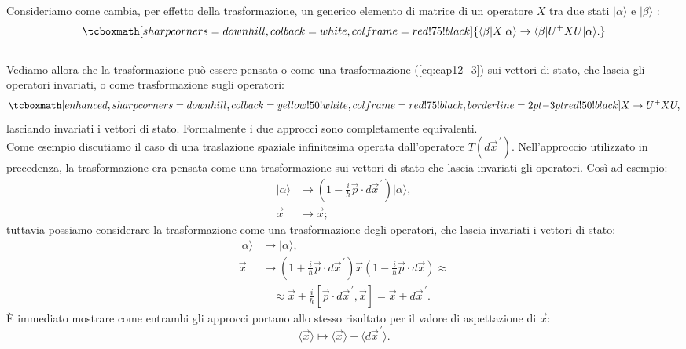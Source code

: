 \documentclass[a4paper,12pt,oneside]{book}
\begin{document}
Consideriamo come cambia, per effetto della trasformazione, un generico elemento di matrice di un operatore ${X}$ tra due stati $|\alpha \rangle$ e $|\beta\rangle$ :
	\begin{equation}
		\tcboxmath[sharp corners=downhill, colback=white, colframe=red!75!black]{
			\langle \beta|{X}|\alpha \rangle   \rightarrow    \langle \beta |{U}^+{X}{U}|\alpha \rangle.
			}
	\end{equation}\\

Vediamo allora che la trasformazione può essere pensata o come una trasformazione (\ref{eq:cap12_3})  sui vettori di stato, che lascia gli operatori invariati, o come trasformazione sugli operatori:
	\begin{equation}
	\label{eq:cap12_4}
		\tcboxmath[enhanced, sharp corners=downhill, colback=yellow!50!white, colframe=red!75!black, borderline={2pt}{-3pt}{red!50!black}]{
		{X}\rightarrow {U}^+ {X}{U},}
	\end{equation}
lasciando invariati i vettori di stato. Formalmente i due approcci sono completamente equivalenti.\\

Come esempio discutiamo il caso di una traslazione spaziale infinitesima operata dall'operatore $T(d\vec{x}^{\,\prime})$.
Nell'approccio utilizzato in precedenza, la trasformazione era pensata come una trasformazione sui vettori di stato che lascia invariati gli operatori. Così ad esempio:
	\begin{align}
		  |\alpha \rangle &\rightarrow (1- \frac{i}{\hbar}\vec{p}\cdot d\vec{x}^{\, \prime}) |\alpha \rangle ,  \\
		  \vec{x}&\rightarrow \vec{x};  
	\end{align}
tuttavia possiamo considerare la trasformazione come una trasformazione degli operatori, che lascia invariati i vettori di stato:
	\begin{align}
			|\alpha \rangle &\rightarrow  |\alpha \rangle , \\
			\vec{x} &\rightarrow \left(1+ \frac{i}{\hbar} \vec{p}\cdot d\vec{x}^{\, \prime}\right) \vec{x} \left(1-\frac{i}{\hbar} \vec{p} \cdot d\vec{x}\right) \approx  \nonumber\\
			& \quad \approx\vec{x}+ \frac{i}{\hbar}[\vec{p}\cdot d\vec{x}^{\, \prime},\vec{x}]=  \vec{x}+ d\vec{x}^{\, \prime} .
	\end{align}
È immediato mostrare come entrambi gli approcci portano allo stesso risultato per il valore di aspettazione di $\vec{x}$:
	\begin{equation}
		\langle \vec{x} \rangle  \mapsto \langle \vec{x}\rangle + \langle d\vec{x}^{\, \prime} \rangle.
	\end{equation}\\
\end{document}
